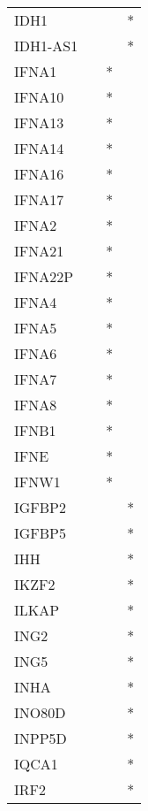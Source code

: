 \begin{longtable}{lccc}
IDH1           &           &     &       * \\
IDH1-AS1       &           &     &       * \\
IFNA1          &           &   * &         \\
IFNA10         &           &   * &         \\
IFNA13         &           &   * &         \\
IFNA14         &           &   * &         \\
IFNA16         &           &   * &         \\
IFNA17         &           &   * &         \\
IFNA2          &           &   * &         \\
IFNA21         &           &   * &         \\
IFNA22P        &           &   * &         \\
IFNA4          &           &   * &         \\
IFNA5          &           &   * &         \\
IFNA6          &           &   * &         \\
IFNA7          &           &   * &         \\
IFNA8          &           &   * &         \\
IFNB1          &           &   * &         \\
IFNE           &           &   * &         \\
IFNW1          &           &   * &         \\
IGFBP2         &           &     &       * \\
IGFBP5         &           &     &       * \\
IHH            &           &     &       * \\
IKZF2          &           &     &       * \\
ILKAP          &           &     &       * \\
ING2           &           &     &       * \\
ING5           &           &     &       * \\
INHA           &           &     &       * \\
INO80D         &           &     &       * \\
INPP5D         &           &     &       * \\
IQCA1          &           &     &       * \\
IRF2           &           &     &       * \\

\end{longtable}
